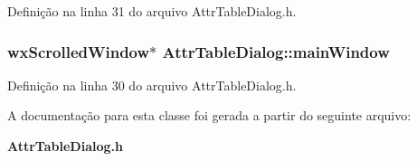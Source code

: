 Definição na linha 31 do arquivo Attr\+Table\+Dialog.\+h.

\subsubsection[{main\+Window}]{\setlength{\rightskip}{0pt plus 5cm}wx\+Scrolled\+Window$\ast$ Attr\+Table\+Dialog\+::main\+Window\hspace{0.3cm}{\ttfamily [protected]}}\label{class_attr_table_dialog_afee1ac12a14def9fe43f35cf83946e78}


Definição na linha 30 do arquivo Attr\+Table\+Dialog.\+h.



A documentação para esta classe foi gerada a partir do seguinte arquivo\+:\begin{DoxyCompactItemize}
\item 
{\bf Attr\+Table\+Dialog.\+h}\end{DoxyCompactItemize}
